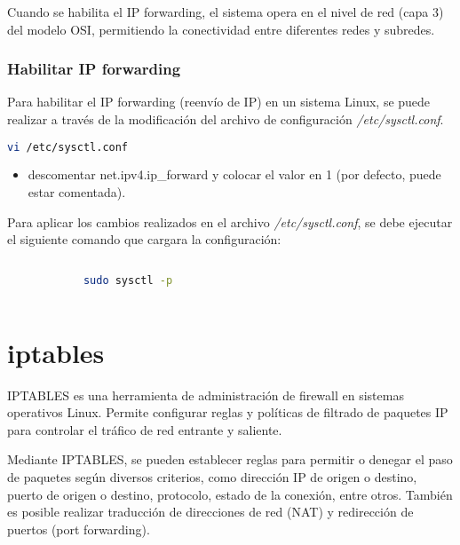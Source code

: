 		Cuando se habilita el IP forwarding, el sistema opera en el nivel de red (capa 3) del modelo OSI, permitiendo la conectividad entre diferentes redes y subredes.\cite{Hobbyists}
		
		\subsubsection{Habilitar IP forwarding}
		
		Para habilitar el IP forwarding (reenvío de IP) en un sistema Linux, se puede realizar a través de la modificación del archivo de configuración \textit{/etc/sysctl.conf}.
		
		\begin{lstlisting}[language=Bash, caption=IP forwarding]
			vi /etc/sysctl.conf
		\end{lstlisting}
		
		\begin{itemize}
			
			\item descomentar net.ipv4.ip\_forward y colocar el valor en 1 (por defecto, puede estar comentada).
			
		\end{itemize}
		
		Para aplicar los cambios realizados en el archivo \textit{/etc/sysctl.conf}, se debe ejecutar el siguiente comando que cargara la configuración:
		
		\begin{lstlisting}[language=Bash, caption=Cargar Configuración]
			
			sudo sysctl -p
			
		\end{lstlisting}
		
		
				
		\section{iptables}
		
		IPTABLES es una herramienta de administración de firewall en sistemas operativos Linux. Permite configurar reglas y políticas de filtrado de paquetes IP para controlar el tráfico de red entrante y saliente.\par
		
		Mediante IPTABLES, se pueden establecer reglas para permitir o denegar el paso de paquetes según diversos criterios, como dirección IP de origen o destino, puerto de origen o destino, protocolo, estado de la conexión, entre otros. También es posible realizar traducción de direcciones de red (NAT) y redirección de puertos (port forwarding).\par
		

